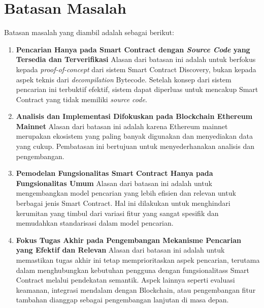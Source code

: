 \section{Batasan Masalah}
\label{sec:batasan-masalah}


Batasan masalah yang diambil adalah sebagai berikut:

\begin{enumerate}
  \item \textbf{Pencarian Hanya pada Smart Contract dengan \textit{Source Code} yang Tersedia dan Terverifikasi} \newline
  Alasan dari batasan ini adalah untuk berfokus kepada \textit{proof-of-concept} dari sistem Smart Contract Discovery, bukan kepada aspek teknis dari \textit{decompilation} Bytecode. Setelah konsep dari sistem pencarian ini terbuktif efektif, sistem dapat diperluas untuk mencakup Smart Contract yang tidak memiliki \textit{source code}.
  \item \textbf{Analisis dan Implementasi Difokuskan pada Blockchain Ethereum Mainnet} \newline
  Alasan dari batasan ini adalah karena Ethereum mainnet merupakan ekosistem yang paling banyak digunakan dan menyediakan data yang cukup. Pembatasan ini bertujuan untuk menyederhanakan analisis dan pengembangan.
  \item \textbf{Pemodelan Fungsionalitas Smart Contract Hanya pada Fungsionalitas Umum} \newline
  Alasan dari batasan ini adalah untuk mengembangkan model pencarian yang lebih efisien dan relevan untuk berbagai jenis Smart Contract. Hal ini dilakukan untuk menghindari kerumitan yang timbul dari variasi fitur yang sangat spesifik dan memudahkan standarisasi dalam model pencarian.
  \item \textbf{Fokus Tugas Akhir pada Pengembangan Mekanisme Pencarian yang Efektif dan Relevan} \newline
  Alasan dari batasan ini adalah untuk memastikan tugas akhir ini tetap memprioritaskan aspek pencarian, terutama dalam menghubungkan kebutuhan pengguna dengan fungsionalitass Smart Contract melalui pendekatan semantik. Aspek lainnya seperti evaluasi keamanan, integrasi mendalam dengan Blockchain, atau pengembangan fitur tambahan dianggap sebagai pengembangan lanjutan di masa depan.
\end{enumerate}
